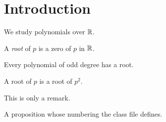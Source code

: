 \section{Introduction}\label{sec:intro}
We study polynomials over $\mathbb{R}$.
\begin{definition}\label{def:root}
A \emph{root} of $p$ is a zero of $p$ in $\mathbb{R}$.
\end{definition}
\begin{theorem}
Every polynomial of odd degree has a root.
\end{theorem}
\begin{lemma}\label{lem:small}
A root of $p$ is a root of $p^2$.
\end{lemma}
\begin{remark}
This is only a remark. %
\end{remark}
\begin{proposition}
A proposition whose numbering the class file defines.
\end{proposition}
